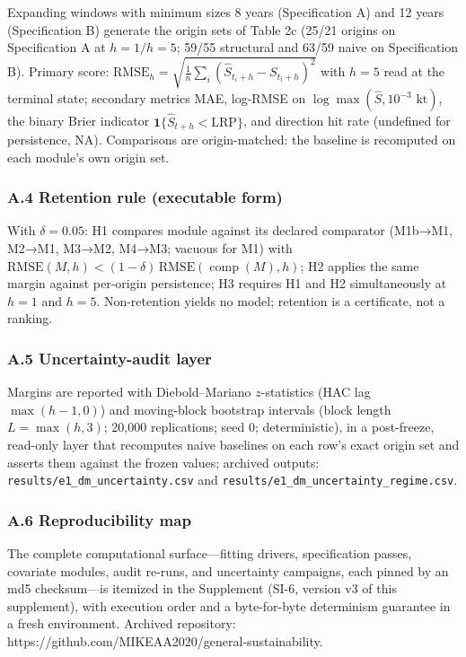 \documentclass[11pt]{article}
\begin{document}
Expanding windows with minimum sizes 8 years (Specification A) and 12
years (Specification B) generate the origin sets of Table 2c (25/21
origins on Specification A at \(h=1/h=5\); 59/55 structural and 63/59
naive on Specification B). Primary score:
\(\mathrm{RMSE}_h = \sqrt{\frac{1}{n}\sum_i (\hat S_{t_i+h} - S_{t_i+h})^2}\)
with \(h=5\) read at the terminal state; secondary metrics MAE, log-RMSE
on \(\log\max(\hat S, 10^{-3}\text{ kt})\), the binary Brier indicator
\(\mathbf{1}\{\hat S_{t+h}<\mathrm{LRP}\}\), and direction hit rate
(undefined for persistence, NA). Comparisons are origin-matched: the
baseline is recomputed on each module's own origin set.

\subsubsection{A.4 Retention rule (executable
form)}\label{a.4-retention-rule-executable-form}

With \(\delta = 0.05\): H1 compares module against its declared
comparator (M1b→M1, M2→M1, M3→M2, M4→M3; vacuous for M1) with
\(\mathrm{RMSE}(M,h) < (1-\delta)\,\mathrm{RMSE}(\operatorname{comp}(M),h)\);
H2 applies the same margin against per-origin persistence; H3 requires
H1 and H2 simultaneously at \(h=1\) and \(h=5\). Non-retention yields no
model; retention is a certificate, not a ranking.

\subsubsection{A.5 Uncertainty-audit
layer}\label{a.5-uncertainty-audit-layer}

Margins are reported with Diebold--Mariano \(z\)-statistics (HAC lag
\(\max(h-1,0)\)) and moving-block bootstrap intervals (block length
\(L = \max(h,3)\); 20,000 replications; seed 0; deterministic), in a
post-freeze, read-only layer that recomputes naive baselines on each
row's exact origin set and asserts them against the frozen values;
archived outputs: \texttt{results/e1\_dm\_uncertainty.csv} and
\texttt{results/e1\_dm\_uncertainty\_regime.csv}.

\subsubsection{A.6 Reproducibility map}\label{a.6-reproducibility-map}

The complete computational surface---fitting drivers, specification
passes, covariate modules, audit re-runs, and uncertainty campaigns,
each pinned by an md5 checksum---is itemized in the Supplement (SI-6,
version v3 of this supplement), with execution order and a byte-for-byte
determinism guarantee in a fresh environment. Archived repository:
https://github.com/MIKEAA2020/general-sustainability.
\end{document}
